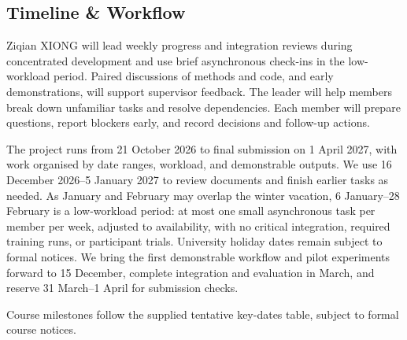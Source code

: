 \documentclass[a4paper,12pt]{article}
\begin{document}
\subsection{Timeline \& Workflow}
Ziqian XIONG will lead weekly progress and integration reviews during concentrated development and use brief asynchronous check-ins in the low-workload period. Paired discussions of methods and code, and early demonstrations, will support supervisor feedback. The leader will help members break down unfamiliar tasks and resolve dependencies. Each member will prepare questions, report blockers early, and record decisions and follow-up actions.

The project runs from 21 October 2026 to final submission on 1 April 2027, with work organised by date ranges, workload, and demonstrable outputs. We use 16 December 2026--5 January 2027 to review documents and finish earlier tasks as needed. As January and February may overlap the winter vacation, 6 January--28 February is a low-workload period: at most one small asynchronous task per member per week, adjusted to availability, with no critical integration, required training runs, or participant trials. University holiday dates remain subject to formal notices. We bring the first demonstrable workflow and pilot experiments forward to 15 December, complete integration and evaluation in March, and reserve 31 March--1 April for submission checks.

Course milestones follow the supplied tentative key-dates table, subject to formal course notices.
\end{document}
